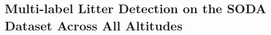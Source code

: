 

\subsection{Multi-label Litter Detection on the SODA Dataset Across All Altitudes}
\label{subsec:5_soda_tiled_multi_dataset_exp}


